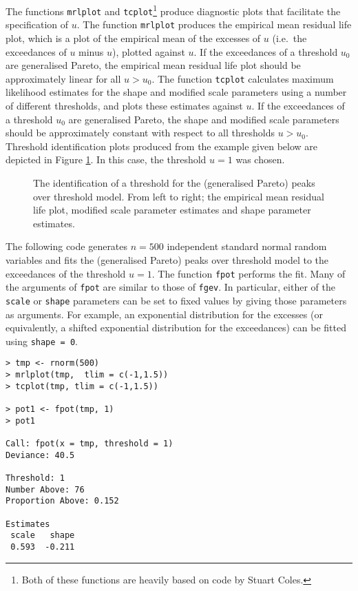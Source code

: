 \documentclass[11pt,a4paper]{article}
\begin{document}
The functions \verb+mrlplot+ and \verb+tcplot+\footnote{Both of these functions are heavily based on code by Stuart Coles.} produce diagnostic plots that facilitate the specification of $u$. The function \verb+mrlplot+ produces the empirical mean residual life plot, which is a plot of the empirical mean of the excesses of $u$ (i.e.\ the exceedances of $u$ minus $u$), plotted against $u$. If the exceedances of a threshold $u_0$ are generalised Pareto, the empirical mean residual life plot should be approximately linear for all $u > u_0$.
The function \verb+tcplot+ calculates maximum likelihood estimates for the shape and modified scale parameters using a number of different thresholds, and plots these estimates against $u$.
If the exceedances of a threshold $u_0$ are generalised Pareto, the shape and modified scale parameters should be approximately constant with respect to all thresholds $u > u_0$.
Threshold identification plots produced from the example given below are depicted in Figure \ref{threshid}.
In this case, the threshold $u = 1$ was chosen.

\begin{figure}
\begin{center}
\vspace{-1.5cm}
\hspace{0cm}
\hspace{0cm} 
\end{center} 
\caption{The identification of a threshold for the (generalised Pareto) peaks over threshold model. From left to right; the empirical mean residual life plot, modified scale parameter estimates and shape parameter estimates.}
\label{threshid}
\end{figure}

The following code generates $n = 500$ independent standard normal random variables and fits the (generalised Pareto) peaks over threshold model to the exceedances of the threshold $u = 1$. 
The function \verb+fpot+ performs the fit.
Many of the arguments of \verb+fpot+ are similar to those of \verb+fgev+.
In particular, either of the \verb+scale+ or \verb+shape+ parameters can be set to fixed values by giving those parameters as arguments.
For example, an exponential distribution for the excesses (or equivalently, a shifted exponential distribution for the exceedances) can be fitted using \verb+shape = 0+.

\begin{verbatim}
> tmp <- rnorm(500)
> mrlplot(tmp,  tlim = c(-1,1.5))
> tcplot(tmp, tlim = c(-1,1.5))

> pot1 <- fpot(tmp, 1)
> pot1

Call: fpot(x = tmp, threshold = 1) 
Deviance: 40.5 

Threshold: 1 
Number Above: 76 
Proportion Above: 0.152 

Estimates
 scale   shape  
 0.593  -0.211  
\end{verbatim}
\end{document}
